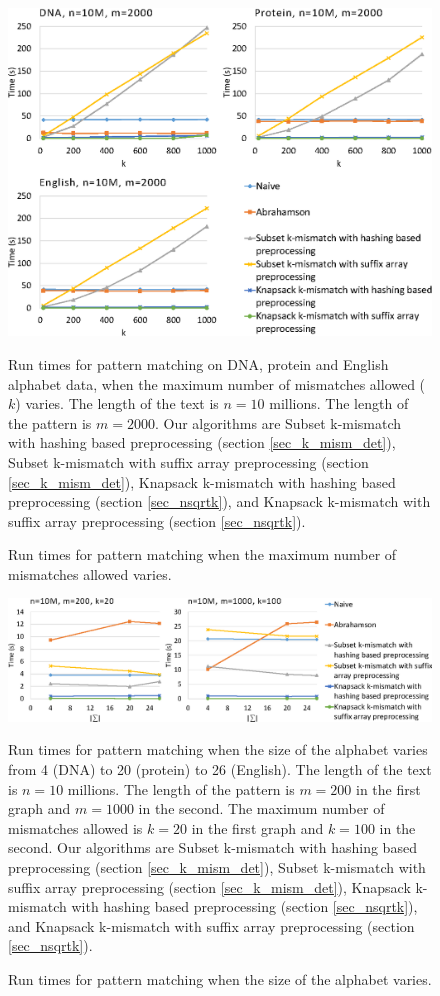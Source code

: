 \begin{figure}
\caption{Run times for pattern matching when the maximum number of mismatches
allowed varies.}
\label{fig_runtimes_varyk} 
\includegraphics{fig3.eps} 

Run times for pattern matching on DNA, protein and
English alphabet data, when the maximum number of mismatches allowed ($k$)
varies.
The length of the text is $n=10$ millions. The length of the pattern is
$m=2000$.
Our algorithms are Subset
k-mismatch with hashing based preprocessing (section
\ref{sec_k_mism_det}), Subset k-mismatch with suffix array preprocessing (section \ref{sec_k_mism_det}),
Knapsack k-mismatch with hashing based preprocessing (section
\ref{sec_nsqrtk}), and Knapsack k-mismatch with suffix array preprocessing (section
\ref{sec_nsqrtk}). 
\end{figure}



\begin{figure}
\caption{Run times for pattern matching when the size of the alphabet varies.}
\label{fig_runtimes_varySigma} 
\includegraphics[width=\linewidth]{fig4.eps} 

Run times for pattern matching when the size of the alphabet varies
from 4 (DNA) to 20 (protein) to 26 (English).
The length of the text is $n=10$ millions. The length of the pattern is
$m=200$ in the first graph and $m=1000$ in the second. The maximum number of
mismatches allowed is $k=20$ in the first graph and $k=100$ in the second.
Our algorithms are Subset k-mismatch with hashing based
preprocessing (section \ref{sec_k_mism_det}), Subset k-mismatch with suffix array preprocessing (section \ref{sec_k_mism_det}),
Knapsack k-mismatch with hashing based preprocessing (section
\ref{sec_nsqrtk}), and Knapsack k-mismatch with suffix array preprocessing (section
\ref{sec_nsqrtk}). 
\end{figure}


